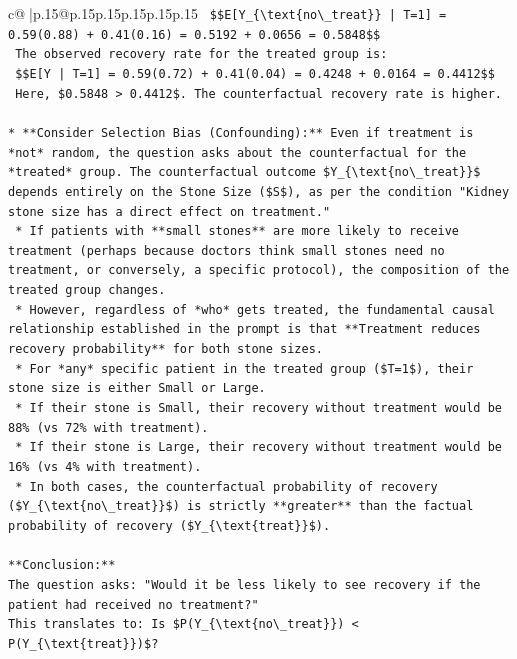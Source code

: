 \documentclass{article}
\begin{document}
{\begin{supertabular}{c@{$\;$}|p{.15\linewidth}@{}p{.15\linewidth}p{.15\linewidth}p{.15\linewidth}p{.15\linewidth}p{.15\linewidth}}
{{{\texttt{    \$\$E{[}Y\_\{\textbackslash{}text\{no\textbackslash{}\_treat\}\} | T=1{]} = 0.59(0.88) + 0.41(0.16) = 0.5192 + 0.0656 = 0.5848\$\$} \\
\texttt{    The observed recovery rate for the treated group is:} \\
\texttt{    \$\$E{[}Y | T=1{]} = 0.59(0.72) + 0.41(0.04) = 0.4248 + 0.0164 = 0.4412\$\$} \\
\texttt{    Here, \$0.5848 > 0.4412\$. The counterfactual recovery rate is higher.} \\
\\ 
\texttt{*   **Consider Selection Bias (Confounding):** Even if treatment is *not* random, the question asks about the counterfactual for the *treated* group. The counterfactual outcome \$Y\_\{\textbackslash{}text\{no\textbackslash{}\_treat\}\}\$ depends entirely on the Stone Size (\$S\$), as per the condition "Kidney stone size has a direct effect on treatment."} \\
\texttt{    *   If patients with **small stones** are more likely to receive treatment (perhaps because doctors think small stones need no treatment, or conversely, a specific protocol), the composition of the treated group changes.} \\
\texttt{    *   However, regardless of *who* gets treated, the fundamental causal relationship established in the prompt is that **Treatment reduces recovery probability** for both stone sizes.} \\
\texttt{    *   For *any* specific patient in the treated group (\$T=1\$), their stone size is either Small or Large.} \\
\texttt{        *   If their stone is Small, their recovery without treatment would be 88\% (vs 72\% with treatment).} \\
\texttt{        *   If their stone is Large, their recovery without treatment would be 16\% (vs 4\% with treatment).} \\
\texttt{    *   In both cases, the counterfactual probability of recovery (\$Y\_\{\textbackslash{}text\{no\textbackslash{}\_treat\}\}\$) is strictly **greater** than the factual probability of recovery (\$Y\_\{\textbackslash{}text\{treat\}\}\$).} \\
\\ 
\texttt{**Conclusion:**} \\
\texttt{The question asks: "Would it be less likely to see recovery if the patient had received no treatment?"} \\
\texttt{This translates to: Is \$P(Y\_\{\textbackslash{}text\{no\textbackslash{}\_treat\}\}) < P(Y\_\{\textbackslash{}text\{treat\}\})\$?} \\
}}}
\end{supertabular}}
\end{document}
